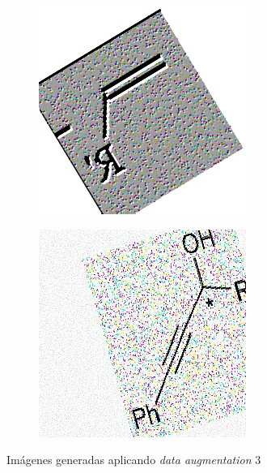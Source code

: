 \begin{figure}[H]
    \begin{subfigure}{.23\textwidth}
        \centering
        \includegraphics[width=1\linewidth]{imagenes/aug3/225.jpg}
    \end{subfigure}%
    \begin{subfigure}{.23\textwidth}
        \centering
        \includegraphics[width=1\linewidth]{imagenes/aug3/347.jpg}
    \end{subfigure}

    \caption{Imágenes generadas aplicando \textit{data augmentation} 3}
    \label{fig:data-aug3}
\end{figure}

